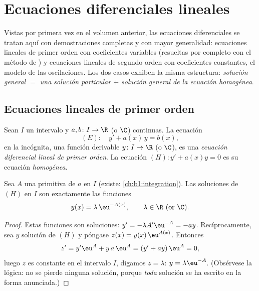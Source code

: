 \chapter{Ecuaciones diferenciales lineales}\label{ch:b1:diffeq}

Vistas por primera vez en el volumen anterior, las ecuaciones
diferenciales se tratan aquí con demostraciones completas y con mayor
generalidad: ecuaciones lineales de primer orden con coeficientes
variables (resueltas por completo con el método de ) y ecuaciones lineales de segundo orden con coeficientes
constantes, el modelo de las oscilaciones. Los dos casos exhiben la
misma estructura: \emph{solución general $=$ una solución particular
$+$ solución general de la ecuación homogénea}.

\section{Ecuaciones lineales de primer orden}

\begin{definition}\label{def:b1:diffeq:linear1}
Sean $I$ un intervalo y $a, b \colon I \to \R$ (o $\C$) continuas. La
ecuación
\[
(E)\colon\quad y' + a(x)\,y = b(x),
\]
en la incógnita, una función derivable $y \colon I \to \R$ (o $\C$),
es una \emph{ecuación diferencial lineal de primer
orden}. La ecuación
$(H)\colon y' + a(x) y = 0$ es su ecuación \emph{homogénea}.
\end{definition}

\begin{theorem}\label{thm:b1:diffeq:homogeneous1}
Sea $A$ una primitiva de $a$ en $I$ (existe:
\cref{ch:b1:integration}). Las soluciones de $(H)$ en $I$ son
exactamente las funciones
\[
y(x) = \lambda\, \eu^{-A(x)}, \qquad \lambda \in \R \text{ (or } \C).
\]
\end{theorem}

\begin{proof}
Estas funciones son soluciones: $y' = -\lambda A' \eu^{-A} = -a y$.
Recíprocamente, sea $y$ solución de $(H)$ y póngase $z(x) = y(x)\, \eu^{A(x)}$. Entonces
\[
z' = y' \eu^{A} + y\, a\, \eu^{A} = (y' + ay)\, \eu^{A} = 0 ,
\]
luego $z$ es constante en el intervalo $I$, digamos $z = \lambda$:
$y = \lambda \eu^{-A}$. (Obsérvese la lógica: no se pierde ninguna
solución, porque \emph{toda} solución se ha escrito en la forma anunciada.)
\end{proof}

